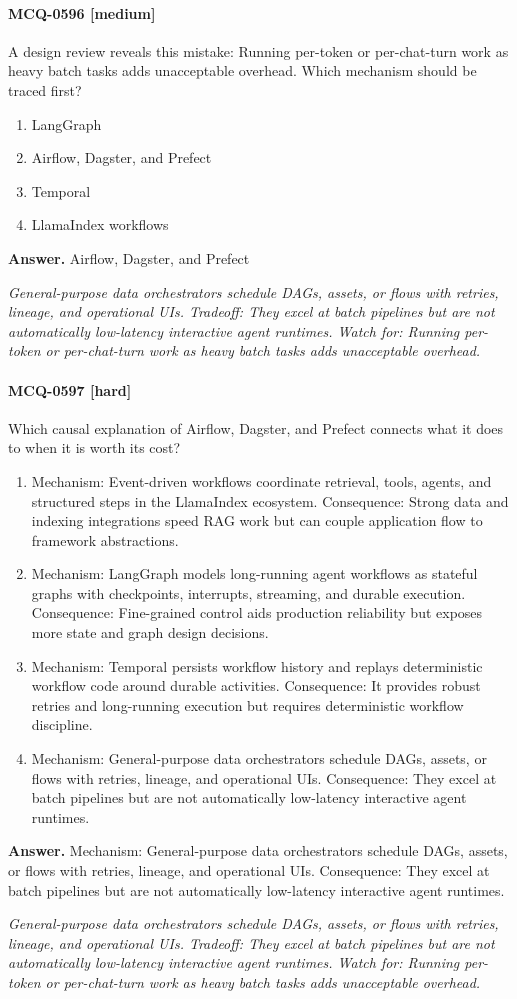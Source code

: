 \paragraph{MCQ-0596 [medium]} A design review reveals this mistake: Running per-token or per-chat-turn work as heavy batch tasks adds unacceptable overhead. Which mechanism should be traced first?
\begin{enumerate}[label=\Alph*.]
\item LangGraph
\item Airflow, Dagster, and Prefect
\item Temporal
\item LlamaIndex workflows
\end{enumerate}
\noindent\textbf{Answer.} Airflow, Dagster, and Prefect
\par\textit{General-purpose data orchestrators schedule DAGs, assets, or flows with retries, lineage, and operational UIs. Tradeoff: They excel at batch pipelines but are not automatically low-latency interactive agent runtimes. Watch for: Running per-token or per-chat-turn work as heavy batch tasks adds unacceptable overhead.}
\paragraph{MCQ-0597 [hard]} Which causal explanation of Airflow, Dagster, and Prefect connects what it does to when it is worth its cost?
\begin{enumerate}[label=\Alph*.]
\item Mechanism: Event-driven workflows coordinate retrieval, tools, agents, and structured steps in the LlamaIndex ecosystem. Consequence: Strong data and indexing integrations speed RAG work but can couple application flow to framework abstractions.
\item Mechanism: LangGraph models long-running agent workflows as stateful graphs with checkpoints, interrupts, streaming, and durable execution. Consequence: Fine-grained control aids production reliability but exposes more state and graph design decisions.
\item Mechanism: Temporal persists workflow history and replays deterministic workflow code around durable activities. Consequence: It provides robust retries and long-running execution but requires deterministic workflow discipline.
\item Mechanism: General-purpose data orchestrators schedule DAGs, assets, or flows with retries, lineage, and operational UIs. Consequence: They excel at batch pipelines but are not automatically low-latency interactive agent runtimes.
\end{enumerate}
\noindent\textbf{Answer.} Mechanism: General-purpose data orchestrators schedule DAGs, assets, or flows with retries, lineage, and operational UIs. Consequence: They excel at batch pipelines but are not automatically low-latency interactive agent runtimes.
\par\textit{General-purpose data orchestrators schedule DAGs, assets, or flows with retries, lineage, and operational UIs. Tradeoff: They excel at batch pipelines but are not automatically low-latency interactive agent runtimes. Watch for: Running per-token or per-chat-turn work as heavy batch tasks adds unacceptable overhead.}
